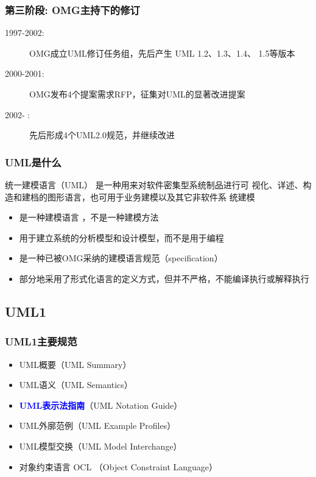 \documentclass[compress]{beamer}
\begin{document}
\begin{frame}
  \frametitle{第三阶段: OMG主持下的修订}
  \begin{description}
    \item [1997-2002:] OMG成立UML修订任务组，先后产生 UML 1.2、1.3、1.4、
      1.5等版本
    \item [2000-2001:] OMG发布4个提案需求RFP，征集对UML的显著改进提案
    \item [2002-    :] 先后形成4个UML2.0规范，并继续改进
  \end{description}
\end{frame}

\begin{frame}
  \frametitle{UML是什么}
  \begin{block}{统一建模语言（UML）}
    是一种用来对软件密集型系统制品进行可
      视化、详述、构造和建档的图形语言，也可用于业务建模以及其它非软件系
      统建模
    \end{block}
    \begin{itemize}
      \item 是一种建模语言 ，不是一种建模方法
      \item 用于建立系统的分析模型和设计模型，而不是用于编程
      \item 是一种已被OMG采纳的建模语言规范（specification）
      \item 部分地采用了形式化语言的定义方式，但并不严格，不能编译执行或解释执行
    \end{itemize}

\end{frame}

\subsection{UML1}

\begin{frame}
  \frametitle{UML1主要规范}
  \begin{itemize}
    \item UML概要（UML Summary）
    \item UML语义（UML Semantics）
    \item \textbf{\textcolor{blue}{UML表示法指南}}（UML Notation Guide）
    \item UML外廓范例（UML Example Profiles）
    \item UML模型交换（UML Model Interchange）
    \item 对象约束语言 OCL （Object Constraint Language）
  \end{itemize}
\end{frame}
\end{document}
